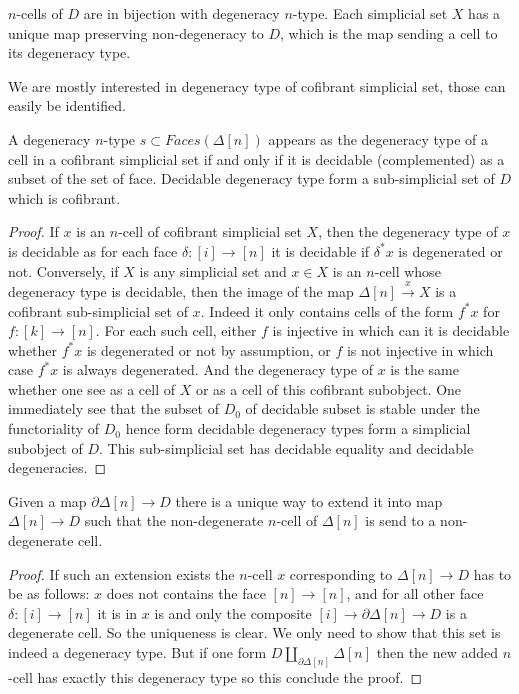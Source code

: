 \documentclass[reqno,10pt,a4paper,oneside,draft]{amsart}
\begin{document}
\begin{lemma}
$n$-cells of $D$ are in bijection with degeneracy $n$-type. Each simplicial set $X$ has a unique map preserving non-degeneracy to $D$, which is the map sending a cell to its degeneracy type.
\end{lemma}




We are mostly interested in degeneracy type of cofibrant simplicial set, those can easily be identified.

\begin{lemma}
A degeneracy $n$-type $s \subset Faces(\Delta[n])$ appears as the degeneracy type of a cell in a cofibrant simplicial set if and only if it is decidable (complemented) as a subset of the set of face. Decidable degeneracy type form a sub-simplicial set of $D$ which is cofibrant.
\end{lemma}

\begin{proof}
If $x$ is an $n$-cell of cofibrant simplicial set $X$, then the degeneracy type of $x$ is decidable as for each face $\delta:[i] \rightarrow [n]$ it is decidable if $\delta^* x $ is degenerated or not.
Conversely, if $X$ is any simplicial set and $x \in X$ is an $n$-cell whose degeneracy type is decidable, then the image of the map $\Delta[n] \overset{x}{\rightarrow} X$ is a cofibrant sub-simplicial set of $x$. Indeed it only contains cells of the form $f^*x$ for $f:[k] \rightarrow [n]$. For each such cell, either $f$ is injective in which can it is decidable whether $f^*x$ is degenerated or not by assumption, or $f$ is not injective in which case $f^*x$ is always degenerated. And the degeneracy type of $x$ is the same whether one see as a cell of $X$ or as a cell of this cofibrant subobject.
One immediately see that the subset of $D_0$ of decidable subset is stable under the functoriality of $D_0$ hence form decidable degeneracy types form a simplicial subobject of $D$. This sub-simplicial set has decidable equality and decidable degeneracies.
\end{proof}

\begin{lemma}

Given a map $\partial \Delta[n] \rightarrow D$ there is a unique way to extend it into map $\Delta[n] \rightarrow D$ such that the non-degenerate $n$-cell of $\Delta[n]$ is send to a non-degenerate cell.
\end{lemma}

\begin{proof}
If such an extension exists the $n$-cell $x$ corresponding to $\Delta[n] \rightarrow D$ has to be as follows: $x$ does not contains the face $[n] \rightarrow [n]$, and for all other face $\delta:[i] \rightarrow [n]$ it is in $x$ is and only the composite $[i] \rightarrow \partial \Delta[n] \rightarrow D$ is a degenerate cell. So the uniqueness is clear. We only need to show that this set is indeed a degeneracy type. But if one form $D \coprod_{\partial \Delta[n]} \Delta[n]$ then the new added $n$-cell has exactly this degeneracy type so this conclude the proof.
\end{proof}
\end{document}
